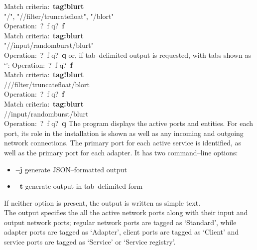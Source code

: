 Match criteria:\ \textbf{tag!blurt}\\
\openSq{} "/\dollarService", "/\serviceName/filter/truncatefloat", "/blort" \closeSq{}\\
Operation:\ \openSq{}?\ f q\closeSq{}?\ \textbf{f}\\
Match criteria:\ \textbf{tag:blurt}\\
\openSq{} "/\serviceName/input/randomburst/blurt" \closeSq{}\\
Operation:\ \openSq{}?\ f q\closeSq{}?\ \textbf{q}
\outputEnd{}
or, if tab--delimited output is requested, with tabs shown as
`\texttt{\boldmath{$\vdash$}}':
\outputBegin{}
Operation:\ \openSq{}?\ f q\closeSq{}?\ \textbf{f}\\
Match criteria:\ \textbf{tag!blurt}\\
/\dollarService\pseudotab/\serviceName/filter/truncatefloat\pseudotab/blort\\
Operation:\ \openSq{}?\ f q\closeSq{}?\ \textbf{f}\\
Match criteria:\ \textbf{tag:blurt}\\
/\serviceName/input/randomburst/blurt\\
Operation:\ \openSq{}?\ f q\closeSq{}?\ \textbf{q}
\outputEnd{}
\newpage
{}
The program  displays the active \yarp{} ports and \mplusm{}
entities.
For each \yarp{} port, its role in the \mplusm{} installation is shown as well as any
incoming and outgoing \yarp{} network connections.
The primary port for each active service is identified, as well as the primary port for
each adapter.
It has two command--line options:
\begin{itemize}
\item \textbf{--j} generate JSON--formatted output
\item \textbf{--t} generate output in tab--delimited form
\end{itemize}
If neither option is present, the output is written as simple text.\\

The output specifies the all the active \yarp{} network ports along with their input and
output \yarp{} network ports; regular \yarp{} network ports are tagged as `Standard',
while \mplusm{} adapter ports are tagged as `Adapter', \mplusm{} client ports are tagged
as `Client' and \mplusm{} service ports are tagged as `Service' or `Service registry'.\\

